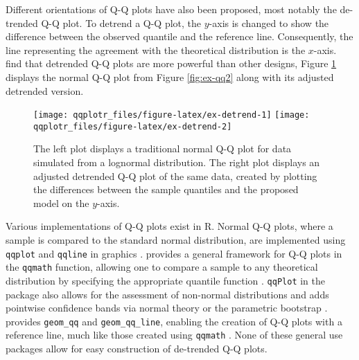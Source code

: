 Different orientations of Q-Q plots have also been proposed, most
notably the de-trended Q-Q plot. To detrend a Q-Q plot, the \(y\)-axis
is changed to show the difference between the observed quantile and the
reference line. Consequently, the line representing the agreement with
the theoretical distribution is the \(x\)-axis. \citet{Loy2016-fg} find
that detrended Q-Q plots are more powerful than other designs,
Figure \ref{fig:ex-detrend} displays the normal Q-Q plot from Figure
\ref{fig:ex-qq2} along with its adjusted detrended version.

\begin{Schunk}
\begin{figure}

{\centering \texttt{[image: qqplotr\_files/figure-latex/ex-detrend-1]} \texttt{[image: qqplotr\_files/figure-latex/ex-detrend-2]} 

}

\caption[The left plot displays a traditional normal Q-Q plot for data simulated from a lognormal distribution]{The left plot displays a traditional normal Q-Q plot for data simulated from a lognormal distribution. The right plot displays an adjusted detrended Q-Q plot of the same data, created by plotting the differences between the sample quantiles and the proposed model on the $y$-axis.}\label{fig:ex-detrend}
\end{figure}
\end{Schunk}

Various implementations of Q-Q plots exist in R. Normal Q-Q plots, where
a sample is compared to the standard normal distribution, are
implemented using \texttt{qqplot} and \texttt{qqline} in 
graphics \citep{R}.  provides a general framework for Q-Q
plots in the \texttt{qqmath} function, allowing one to compare a sample
to any theoretical distribution by specifying the appropriate quantile
function \citep{lattice}. \texttt{qqPlot} in the  package also
allows for the assessment of non-normal distributions and adds pointwise
confidence bands via normal theory or the parametric bootstrap
\citep{car}.  provides \texttt{geom\_qq} and
\texttt{geom\_qq\_line}, enabling the creation of Q-Q plots with a
reference line, much like those created using \texttt{qqmath}
\citep{ggplot2}. None of these general use packages allow for easy
construction of de-trended Q-Q plots.

